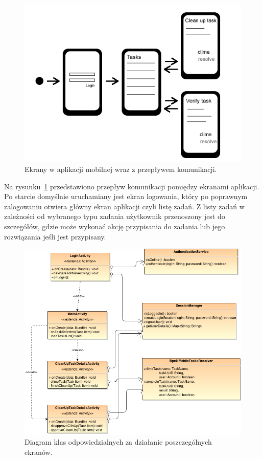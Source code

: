 \begin{figure}[h]
\centerline{\includegraphics[scale=0.6]{activityFlowDiagram}}
\caption{Ekrany w aplikacji mobilnej wraz z przepływem komunikacji.}
\label{fig:activityFlowDiagram}
\end{figure}

Na rysunku~\ref{fig:activityFlowDiagram} przedstawiono przepływ komunikacji pomiędzy ekranami aplikacji. Po starcie domyślnie uruchamiany jest ekran logowania, który po poprawnym zalogowaniu otwiera główny ekran aplikacji czyli listę zadań. Z listy zadań w zależności od wybranego typu zadania użytkownik przenoszony jest do szczegółów, gdzie może wykonać akcję przypisania do zadania lub jego rozwiązania jeśli jest przypisany. 

\begin{figure}[h]
\centerline{\includegraphics[scale=0.6]{activitiesClassDiagram}}
\caption{Diagram klas odpowiedzialnych za działanie poszczególnych ekranów.}
\label{fig:activitiesClassDiagram}
\end{figure}

